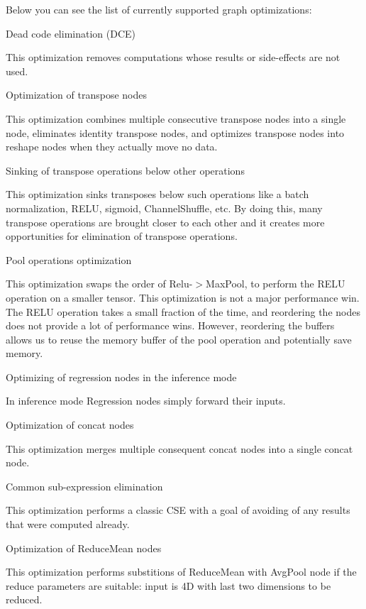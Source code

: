 Below you can see the list of currently supported graph optimizations\+:
\begin{DoxyItemize}
\item Dead code elimination (D\+CE)

This optimization removes computations whose results or side-\/effects are not used.
\item Optimization of transpose nodes

This optimization combines multiple consecutive transpose nodes into a single node, eliminates identity transpose nodes, and optimizes transpose nodes into reshape nodes when they actually move no data.
\item Sinking of transpose operations below other operations

This optimization sinks transposes below such operations like a batch normalization, R\+E\+LU, sigmoid, Channel\+Shuffle, etc. By doing this, many transpose operations are brought closer to each other and it creates more opportunities for elimination of transpose operations.
\item Pool operations optimization

This optimization swaps the order of Relu-\/$>$Max\+Pool, to perform the R\+E\+LU operation on a smaller tensor. This optimization is not a major performance win. The R\+E\+LU operation takes a small fraction of the time, and reordering the nodes does not provide a lot of performance wins. However, reordering the buffers allows us to reuse the memory buffer of the pool operation and potentially save memory.
\item Optimizing of regression nodes in the inference mode

In inference mode Regression nodes simply forward their inputs.
\item Optimization of concat nodes

This optimization merges multiple consequent concat nodes into a single concat node.
\item Common sub-\/expression elimination

This optimization performs a classic C\+SE with a goal of avoiding of any results that were computed already.
\item Optimization of Reduce\+Mean nodes

This optimization performs substitions of Reduce\+Mean with Avg\+Pool node if the reduce parameters are suitable\+: input is 4D with last two dimensions to be reduced.
\end{DoxyItemize}

